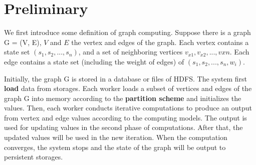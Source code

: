 \section{Preliminary}
We first introduce some definition of graph computing.
Suppose there is a graph G = (V, E), $V$ and $E$ the vertex
and edges of the graph. Each vertex contains a state set $(s_1, s_2, ..., s_n)$,
and a set of neighboring vertices $v_{x1}, v_{x2}, ..., v{xn}$.
Each edge contains a state set (including the weight of edges) of
$(s_1, s_2, ..., s_n, w_i)$.

Initially, the graph G is stored in a database or files of HDFS. The system
first \textbf{load} data from storages. Each worker loads a subset of vertices
and edges of the graph G into memory according to the \textbf{partition scheme}
and initializes the values.
Then, each worker conducts iterative computations to
produce an output from vertex and edge values
according to the computing models. The output is used for updating
values in the second phase of computations. After that, the updated values
will be used in the new iteration.
When the computation converges, the system stops and the state of the graph
will be output to persistent storages.
